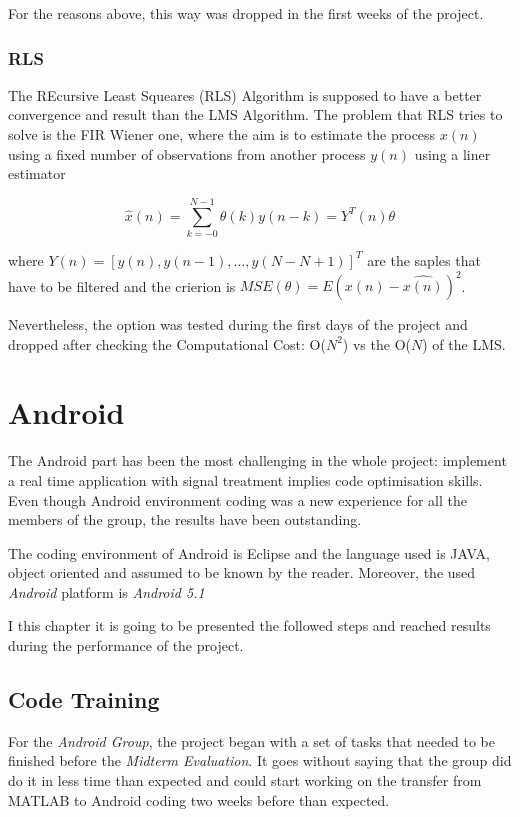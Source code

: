 \documentclass[11pt,a4paper,english]{book}  %
\theoremstyle{definition}  %
\theoremstyle{plain}  %
\theoremstyle{remark}  %
\begin{document}
	For the reasons above, this way was dropped in the first weeks of the project.
	
	\subsection{RLS}
	
	The REcursive Least Squeares (RLS) Algorithm \cite{asp} is supposed to have a better convergence and result than the LMS Algorithm. The problem that RLS tries to solve is the FIR Wiener one, where the aim is to estimate the process $x(n)$ using a fixed number of observations from another process ${y(n)}$ using a liner estimator
	
	\begin{equation}
	\hat{x}(n)=\sum \limits_{k=-0}^{N-1} \theta(k)y(n-k)=Y^T (n)\theta
	\end{equation}
	
	where $Y(n)= [y(n),y(n-1),\dots,y(N-N+1)]^T$ are the saples that have to be filtered and the crierion is $MSE(\theta)=E{(x(n)-\hat{x(n)})^2}$.
	
	Nevertheless, the option was tested during the first days of the project and dropped after checking the Computational Cost: O($N^2$) vs the  O($N$) of the LMS.



\chapter{Android}

The Android part has been the most challenging in the whole project: implement a real time application with signal treatment implies code optimisation skills. Even though Android environment coding was a new experience for all the members of the group, the results have been outstanding.

The coding environment of Android is Eclipse and the language used is JAVA, object oriented and assumed to be known by the reader. Moreover, the used \textit{Android} platform is \textit{Android 5.1}

I this chapter it is going to be presented the followed steps and reached results during the performance of the project.

\section{Code Training}

For the \textit{Android Group}, the project began with a set of tasks that needed to be finished before the \textit{Midterm Evaluation}. It goes without saying that the group did do it in less time than expected and could start working on the transfer from MATLAB to Android coding two weeks before than expected.
\end{document}
